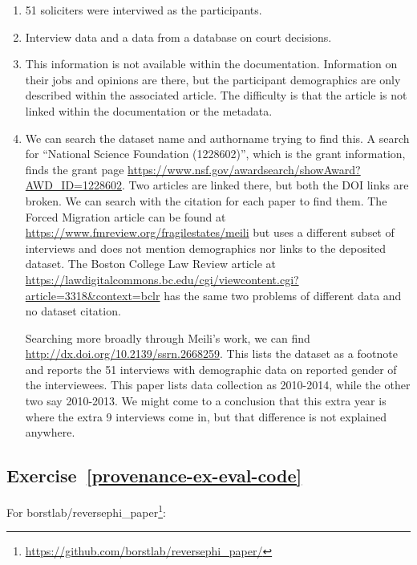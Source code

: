 \documentclass[
]{krantz}
\renewcommand{\href}[2]{#2\footnote{\url{#1}}}
\begin{document}
\begin{enumerate}
\def\labelenumi{\arabic{enumi}.}
\item
  51 soliciters were interviwed as the participants.
\item
  Interview data and a data from a database on court decisions.
\item
  This information is not available within the documentation.
  Information on their jobs and opinions are there,
  but the participant demographics are only described within the associated article.
  The difficulty is that the article is not linked within the documentation or the metadata.
\item
  We can search the dataset name and authorname trying to find this.
  A search for ``National Science Foundation (1228602)'',
  which is the grant information,
  finds the grant page \url{https://www.nsf.gov/awardsearch/showAward?AWD_ID=1228602}.
  Two articles are linked there,
  but both the DOI links are broken.
  We can search with the citation for each paper to find them.
  The Forced Migration article can be found at \url{https://www.fmreview.org/fragilestates/meili}
  but uses a different subset of interviews and does not mention demographics nor links to the deposited dataset.
  The Boston College Law Review article at \url{https://lawdigitalcommons.bc.edu/cgi/viewcontent.cgi?article=3318\&context=bclr}
  has the same two problems of different data and no dataset citation.

  Searching more broadly through Meili's work, we can find \url{http://dx.doi.org/10.2139/ssrn.2668259}.
  This lists the dataset as a footnote and reports the 51 interviews with demographic data on reported gender of the interviewees.
  This paper lists data collection as 2010-2014,
  while the other two say 2010-2013.
  We might come to a conclusion that this extra year is where the extra 9 interviews come in,
  but that difference is not explained anywhere.
\end{enumerate}

\hypertarget{exercise-refprovenance-ex-eval-code}{%
\subsection*{Exercise~\ref{provenance-ex-eval-code}}\label{exercise-refprovenance-ex-eval-code}}


For \href{https://github.com/borstlab/reversephi_paper/}{borstlab/reversephi\_paper}:
\end{document}
